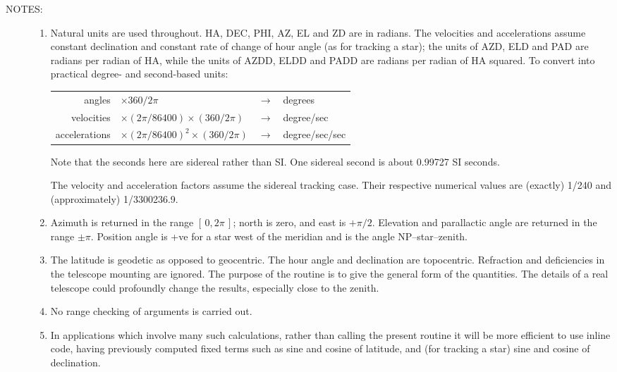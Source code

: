 \documentclass[11pt,twoside]{article}
\newlength{\oldspacing}
\newcommand{\notes}[1]
{
  \goodbreak
  \setlength{\oldspacing}{\topsep}
  \setlength{\topsep}{0.3ex}
  \begin{description}
    \item[NOTES]:
        #1
  \end{description}
  \setlength{\topsep}{\oldspacing}
}
\renewcommand{\notes}[1]
   {
      \begin{description}
         \item[NOTES:]
            #1
      \end{description}
   }
\begin{document}
\notes
{
 \begin{enumerate}
  \setlength{\parskip}{\medskipamount}
  \item Natural units are used throughout.  HA, DEC, PHI, AZ, EL
        and ZD are in radians.  The velocities and accelerations
        assume constant declination and constant rate of change of
        hour angle (as for tracking a star);  the units of AZD, ELD
        and PAD are radians per radian of HA, while the units of AZDD,
        ELDD and PADD are radians per radian of HA squared.  To
        convert into practical degree- and second-based units:

        \begin{center}
        \begin{tabular}{rlcl}
                  angles & $\times 360/2\pi$ & $\rightarrow$ & degrees \\
              velocities & $\times (2\pi/86400) \times (360/2\pi)$
                                             & $\rightarrow$ & degree/sec \\
           accelerations & $\times (2\pi/86400)^2 \times (360/2\pi)$
                                             & $\rightarrow$ & degree/sec/sec \\
        \end{tabular}
        \end{center}

        Note that the seconds here are sidereal rather than SI.  One
        sidereal second is about 0.99727 SI seconds.

        The velocity and acceleration factors assume the sidereal
        tracking case.  Their respective numerical values are (exactly)
        1/240 and (approximately) 1/3300236.9.
  \item Azimuth is returned in the range $[\,0,2\pi\,]$;  north is zero,
        and east is $+\pi/2$.  Elevation and parallactic angle are
        returned in the range $\pm\pi$.  Position angle is +ve
        for a star west of the meridian and is the angle NP--star--zenith.
  \item The latitude is geodetic as opposed to geocentric.  The
        hour angle and declination are topocentric.  Refraction and
        deficiencies in the telescope mounting are ignored.  The
        purpose of the routine is to give the general form of the
        quantities.  The details of a real telescope could profoundly
        change the results, especially close to the zenith.
  \item No range checking of arguments is carried out.
  \item In applications which involve many such calculations, rather
        than calling the present routine it will be more efficient to
        use inline code, having previously computed fixed terms such
        as sine and cosine of latitude, and (for tracking a star)
        sine and cosine of declination.
 \end{enumerate}
}
\end{document}
